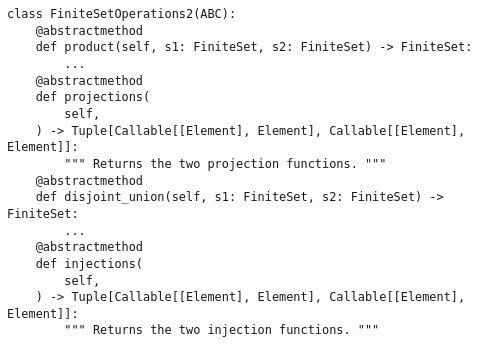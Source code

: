 \par\begin{minipage}{75ex}
\begin{verbatim}
class FiniteSetOperations2(ABC):
    @abstractmethod
    def product(self, s1: FiniteSet, s2: FiniteSet) -> FiniteSet:
        ...
    @abstractmethod
    def projections(
        self,
    ) -> Tuple[Callable[[Element], Element], Callable[[Element], Element]]:
        """ Returns the two projection functions. """
    @abstractmethod
    def disjoint_union(self, s1: FiniteSet, s2: FiniteSet) -> FiniteSet:
        ...
    @abstractmethod
    def injections(
        self,
    ) -> Tuple[Callable[[Element], Element], Callable[[Element], Element]]:
        """ Returns the two injection functions. """
\end{verbatim}
\end{minipage}\par